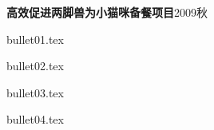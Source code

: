 \begin {rProject}{\bf 高效促进两脚兽为小猫咪备餐项目}{2009秋}{}{}
\item {bullet01.tex}
\item {bullet02.tex}
\item {bullet03.tex}
\item {bullet04.tex}
\end {rProject}
